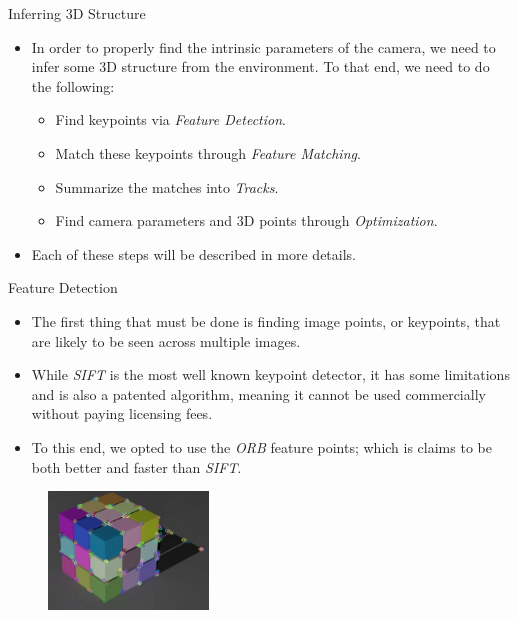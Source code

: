 \documentclass[aspectratio=43]{beamer}
\begin{document}
\begin{frame}{Inferring 3D Structure}
  \begin{itemize}
  \item In order to properly find the intrinsic parameters of the camera, we
    need to infer some 3D structure from the environment. To that end, we need
    to do the following:
    \begin{itemize}
    \item Find keypoints via \emph{Feature Detection}.
    \item Match these keypoints through \emph{Feature Matching}.
    \item Summarize the matches into \emph{Tracks}.
    \item Find camera parameters and 3D points through \emph{Optimization}.
    \end{itemize}
  \item Each of these steps will be described in more details.
  \end{itemize}
\end{frame}


\begin{frame}{Feature Detection}

  \begin{itemize}
  \item The first thing that must be done is finding image points, or keypoints,
    that are likely to be seen across multiple images.
  \item While \emph{SIFT} is the most well known keypoint detector, it has some
    limitations and is also a patented algorithm, meaning it cannot be used
    commercially without paying licensing fees.
  \item To this end, we opted to use the \emph{ORB} feature points; which is
    claims to be both better and faster than \emph{SIFT}.
  \end{itemize}

  \begin{figure}
    \centering
    \includegraphics[width=0.38\textwidth]{img/kps_0}
  \end{figure}

\end{frame}
\end{document}
